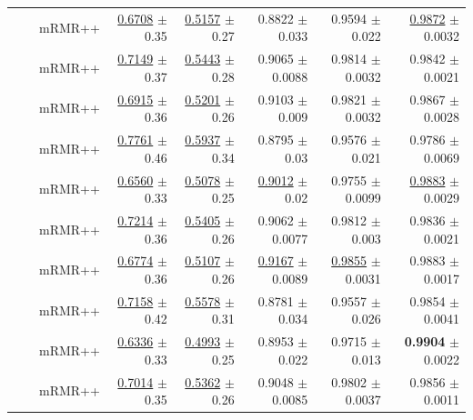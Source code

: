 \begin{longtable}{llp{}rrrrr}
 &  & mRMR++ & \underline{0.6708} {\scriptsize $\pm$ 0.35} & \underline{0.5157} {\scriptsize $\pm$ 0.27} & 0.8822 {\scriptsize $\pm$ 0.033} & 0.9594 {\scriptsize $\pm$ 0.022} & \underline{0.9872} {\scriptsize $\pm$ 0.0032} \\
 &  & mRMR++ & \underline{0.7149} {\scriptsize $\pm$ 0.37} & \underline{0.5443} {\scriptsize $\pm$ 0.28} & 0.9065 {\scriptsize $\pm$ 0.0088} & 0.9814 {\scriptsize $\pm$ 0.0032} & 0.9842 {\scriptsize $\pm$ 0.0021} \\
 &  & mRMR++ & \underline{0.6915} {\scriptsize $\pm$ 0.36} & \underline{0.5201} {\scriptsize $\pm$ 0.26} & 0.9103 {\scriptsize $\pm$ 0.009} & 0.9821 {\scriptsize $\pm$ 0.0032} & 0.9867 {\scriptsize $\pm$ 0.0028} \\
 &  & mRMR++ & \underline{0.7761} {\scriptsize $\pm$ 0.46} & \underline{0.5937} {\scriptsize $\pm$ 0.34} & 0.8795 {\scriptsize $\pm$ 0.03} & 0.9576 {\scriptsize $\pm$ 0.021} & 0.9786 {\scriptsize $\pm$ 0.0069} \\
 &  & mRMR++ & \underline{0.6560} {\scriptsize $\pm$ 0.33} & \underline{0.5078} {\scriptsize $\pm$ 0.25} & \underline{0.9012} {\scriptsize $\pm$ 0.02} & 0.9755 {\scriptsize $\pm$ 0.0099} & \underline{0.9883} {\scriptsize $\pm$ 0.0029} \\
 &  & mRMR++ & \underline{0.7214} {\scriptsize $\pm$ 0.36} & \underline{0.5405} {\scriptsize $\pm$ 0.26} & 0.9062 {\scriptsize $\pm$ 0.0077} & 0.9812 {\scriptsize $\pm$ 0.003} & 0.9836 {\scriptsize $\pm$ 0.0021} \\
 &  & mRMR++ & \underline{0.6774} {\scriptsize $\pm$ 0.36} & \underline{0.5107} {\scriptsize $\pm$ 0.26} & \underline{0.9167} {\scriptsize $\pm$ 0.0089} & \underline{0.9855} {\scriptsize $\pm$ 0.0031} & 0.9883 {\scriptsize $\pm$ 0.0017} \\
 &  & mRMR++ & \underline{0.7158} {\scriptsize $\pm$ 0.42} & \underline{0.5578} {\scriptsize $\pm$ 0.31} & 0.8781 {\scriptsize $\pm$ 0.034} & 0.9557 {\scriptsize $\pm$ 0.026} & 0.9854 {\scriptsize $\pm$ 0.0041} \\
 &  & mRMR++ & \underline{0.6336} {\scriptsize $\pm$ 0.33} & \underline{0.4993} {\scriptsize $\pm$ 0.25} & 0.8953 {\scriptsize $\pm$ 0.022} & 0.9715 {\scriptsize $\pm$ 0.013} & \textbf{0.9904} {\scriptsize $\pm$ 0.0022} \\
 &  & mRMR++ & \underline{0.7014} {\scriptsize $\pm$ 0.35} & \underline{0.5362} {\scriptsize $\pm$ 0.26} & 0.9048 {\scriptsize $\pm$ 0.0085} & 0.9802 {\scriptsize $\pm$ 0.0037} & 0.9856 {\scriptsize $\pm$ 0.0011} \\

\end{longtable}
